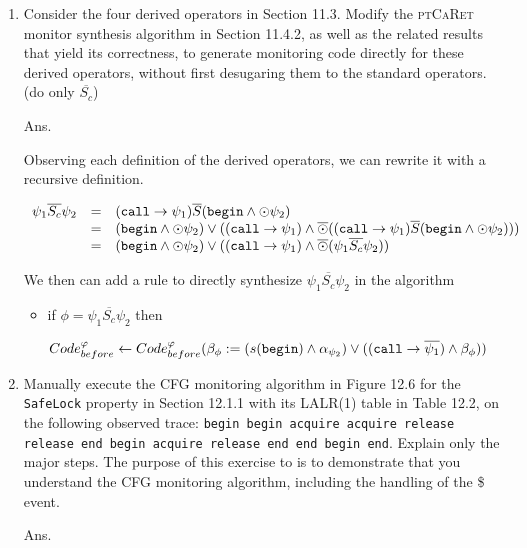 \documentclass{article}
\begin{document}
\begin{enumerate}
\item Consider the four derived operators in Section 11.3.
Modify the \textsc{ptCaRet} monitor synthesis algorithm in Section 11.4.2,
as well as the related results that yield its correctness,
to generate monitoring code directly for these derived operators,
without first desugaring them to the standard operators.
(do only $\overline{S_c}$)

Ans.

Observing each definition of the derived operators,
we can rewrite it with a recursive definition.

\newcommand{\Sc}{\ensuremath{\overline{S_c}}\xspace}

$$
\begin{array}{lll}
	\psi_1\Sc\psi_2 & = & (\CALL \to \psi_1)\ASince (\BEGIN \land \Prev \psi_2)                                                      \\
	                & = & (\BEGIN\land\Prev\psi_2)\lor((\CALL\to\psi_1)\land\APrev((\CALL\to\psi_1)\ASince(\BEGIN\land\Prev\psi_2))) \\
	                & = & (\BEGIN\land\Prev\psi_2)\lor((\CALL\to\psi_1)\land\APrev(\psi_1\Sc\psi_2))
\end{array}
$$

We then can add a rule to directly synthesize $\psi_1 \Sc \psi_2$ in the algorithm
\begin{itemize}
	\item if $\phi = \psi_1\Sc\psi_2$ then
	
	$Code^\varphi_{before}\leftarrow Code^{\varphi}_{before}
	(\beta_\phi := (s(\texttt{begin})\land\alpha_{\psi_2})\lor((\texttt{call}\to\overline{\psi_1})\land\beta_\phi))$
\end{itemize}

\item Manually execute the CFG monitoring algorithm in Figure 12.6 for the
\texttt{SafeLock} property in Section 12.1.1 with its LALR(1) table in Table 12.2,
on the following observed trace:
\texttt{begin begin acquire acquire release release end begin acquire release end
end begin end}.
Explain only the major steps.
The purpose of this exercise to is to demonstrate that you understand the CFG
monitoring algorithm, including the handling of the \$ event.

Ans.

\newcommand{\ACQ}{\texttt{acquire}\xspace}
\newcommand{\REL}{\texttt{release}\xspace}
\newcommand{\REDUCE}{\ensuremath{reduce}}
\newcommand{\SHIFT}{\ensuremath{shift}}


\end{enumerate}
\end{document}
